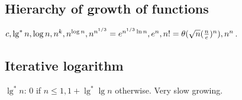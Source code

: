 \documentclass[oneside, article]{memoir}
\begin{document}
\subsection{Hierarchy of growth of functions}
$c, \lg^{*} n, \log n, n^{k}, n^{\log n}, \\
n^{n^{1/3}} = e^{n^{1/3}\ln n}, e^{n}, n! = \theta(\sqrt{n}(\frac{n}{e})^{n}), n^{n}$.

\subsection{Iterative logarithm}
$\lg^{*} n$: 0 if $n\leq 1, 1+\lg^{*}\lg n $ otherwise. Very slow growing.




\end{document}

